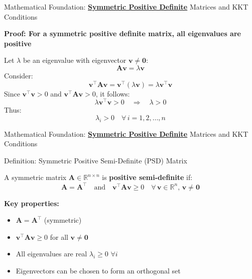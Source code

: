 \documentclass{beamer}
\begin{document}
\begin{frame}{Mathematical Foundation: \textbf{\underline{Symmetric Positive Definite}} Matrices and KKT Conditions}

\textbf{Proof: For a symmetric positive definite matrix, all eigenvalues are positive}

Let $\lambda$ be an eigenvalue with eigenvector $\bm{v} \neq \bm{0}$:
\[
\bm{A} \bm{v} = \lambda \bm{v}
\]
Consider:
\[
\bm{v}^\top \bm{A} \bm{v} = \bm{v}^\top (\lambda \bm{v}) = \lambda \bm{v}^\top \bm{v}
\]
Since $\bm{v}^\top \bm{v} > 0$ and $\bm{v}^\top \bm{A} \bm{v} > 0$, it follows:
\[
\lambda \bm{v}^\top \bm{v} > 0 \quad \Rightarrow \quad \lambda > 0
\]
Thus:
\[
\boxed{\lambda_i > 0 \quad \forall \, i = 1,2,\dots, n}
\]

\end{frame}


\begin{frame}{Mathematical Foundation: \textbf{\underline{Symmetric Positive Definite}} Matrices and KKT Conditions}

\begin{block}{Definition: Symmetric Positive Semi-Definite (PSD) Matrix}

A symmetric matrix $\bm{A} \in \mathbb{R}^{n \times n}$ is \textbf{positive semi-definite} if:
\[
\bm{A} = \bm{A}^\top \quad \text{and} \quad \bm{v}^\top \bm{A} \bm{v} \geq 0 \quad \forall \, \bm{v} \in \mathbb{R}^n, \, \bm{v} \neq \bm{0}
\]

\vspace{0.3cm}

\textbf{Key properties:}
\begin{itemize}
    \item $\bm{A} = \bm{A}^\top$ (symmetric)
    \item $\bm{v}^\top \bm{A} \bm{v} \geq 0$ for all $\bm{v} \neq \bm{0}$
    \item All eigenvalues are real $\lambda_i \geq 0$ $\forall i$
    \item Eigenvectors can be chosen to form an orthogonal set
\end{itemize}

\end{block}

\end{frame}
\end{document}
